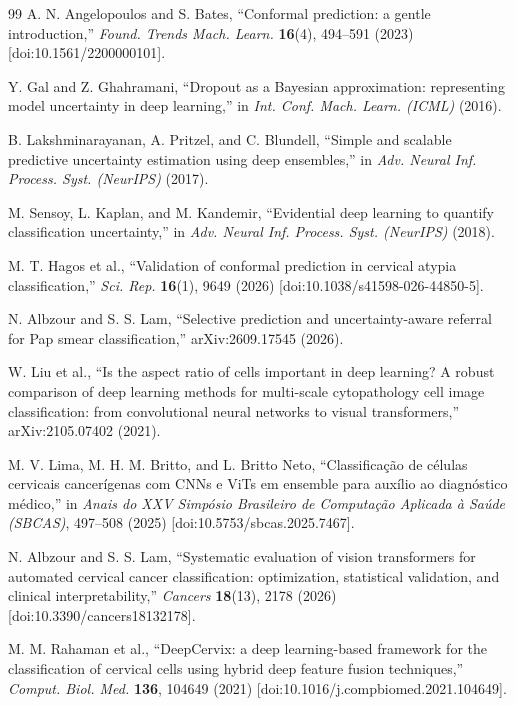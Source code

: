 \documentclass[12pt,letterpaper]{article}
\begin{document}
{\begin{thebibliography}{99}
A. N. Angelopoulos and S. Bates, ``Conformal prediction: a gentle introduction,'' \textit{Found. Trends Mach. Learn.} \textbf{16}(4), 494--591 (2023) [doi:10.1561/2200000101].

Y. Gal and Z. Ghahramani, ``Dropout as a Bayesian approximation: representing model uncertainty in deep learning,'' in \textit{Int. Conf. Mach. Learn. (ICML)} (2016).

B. Lakshminarayanan, A. Pritzel, and C. Blundell, ``Simple and scalable predictive uncertainty estimation using deep ensembles,'' in \textit{Adv. Neural Inf. Process. Syst. (NeurIPS)} (2017).

M. Sensoy, L. Kaplan, and M. Kandemir, ``Evidential deep learning to quantify classification uncertainty,'' in \textit{Adv. Neural Inf. Process. Syst. (NeurIPS)} (2018).

M. T. Hagos et al., ``Validation of conformal prediction in cervical atypia classification,'' \textit{Sci. Rep.} \textbf{16}(1), 9649 (2026) [doi:10.1038/s41598-026-44850-5].

N. Albzour and S. S. Lam, ``Selective prediction and uncertainty-aware referral for Pap smear classification,'' arXiv:2609.17545 (2026).

W. Liu et al., ``Is the aspect ratio of cells important in deep learning? A robust comparison of deep learning methods for multi-scale cytopathology cell image classification: from convolutional neural networks to visual transformers,'' arXiv:2105.07402 (2021).

M. V. Lima, M. H. M. Britto, and L. Britto Neto, ``Classifica\c{c}\~ao de c\'elulas cervicais cancer\'igenas com CNNs e ViTs em ensemble para aux\'ilio ao diagn\'ostico m\'edico,'' in \textit{Anais do XXV Simp\'osio Brasileiro de Computa\c{c}\~ao Aplicada \`a Sa\'ude (SBCAS)}, 497--508 (2025) [doi:10.5753/sbcas.2025.7467].

N. Albzour and S. S. Lam, ``Systematic evaluation of vision transformers for automated cervical cancer classification: optimization, statistical validation, and clinical interpretability,'' \textit{Cancers} \textbf{18}(13), 2178 (2026) [doi:10.3390/cancers18132178].

M. M. Rahaman et al., ``DeepCervix: a deep learning-based framework for the classification of cervical cells using hybrid deep feature fusion techniques,'' \textit{Comput. Biol. Med.} \textbf{136}, 104649 (2021) [doi:10.1016/j.compbiomed.2021.104649].


\end{thebibliography}}
\end{document}
